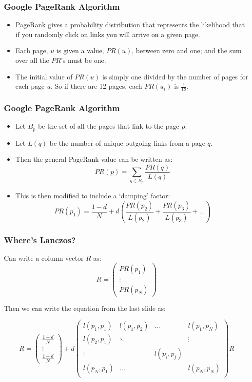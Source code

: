 \documentclass[pdf]{beamer}
\begin{document}
\begin{frame}
\frametitle{Google PageRank Algorithm}
\begin{itemize}
\item PageRank gives a probability distribution that represents the likelihood that if you randomly click on links you will arrive on a given page. 
\item Each page, $u$ is given a value, $PR(u)$, between zero and one; and the sum over all the $PR$'s must be one.
\item The initial value of $PR(u)$ is simply one divided by the number of pages for each page $u$. So if there are 12 pages, each $PR(u_i)$ is $\frac{1}{12}$.
\end{itemize}
\end{frame}




\begin{frame}
\frametitle{Google PageRank Algorithm}
\begin{itemize}
\item Let $B_p$ be the set of all the pages that link to the page $p$.
\item Let $L(q)$ be the number of unique outgoing links from a page $q$.
\item Then the general PageRank value can be written as: \[PR(p) = \sum_{q \in B_p} \frac{PR(q)}{L(q)} \]
\item This is then modified to include a `damping' factor: \[ PR(p_1) = \frac{1-d}{N} + d \left( \frac{PR(p_2)}{L(p_2)} + \frac{PR(p_3)}{L(p_3)} + \dots \right) \]
\end{itemize}
\end{frame}


\begin{frame}
\frametitle{Where's Lanczos?}

Can write a column vector $R$ as: \[R = \left( \begin{array}{c} PR(p_1) \\ \vdots \\ PR(p_N) \end{array} \right) \]

Then we can write the equation from the last slide as:

\[ R = \left( \begin{array}{c} \frac{1-d}{N} \\ \vdots \\ \frac{1-d}{N} \end{array} \right) +d \left( \begin{array}{cccc}
l(p_1,p_1) & l(p_1,p_2) & \dots & l(p_1,p_N)\\
l(p_2,p_1) & \ddots & & \vdots \\
\vdots & & l(p_i,p_j) & \\
l(p_N,p_1) & \dots & & l(p_N,p_N)\\
 \end{array} \right) R \]
\end{frame}
\end{document}
